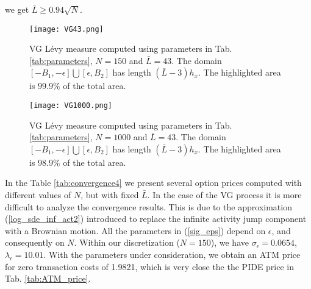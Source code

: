 we get $\bar L \geq 0.94 \sqrt{N}$.
\begin{figure}[t!]
   \centering
   \texttt{[image: VG43.png]}
   \caption{VG L\'evy measure computed using parameters in Tab. \ref{tab:parameters}, $N=150$ and $\bar L=43$. 
   The domain $[-B_1,-\epsilon]\bigcup [\epsilon,B_2]$ has length $(\bar L-3) h_x$. The highlighted area is $99.9\%$ of the total area.}
   \label{Fig15} 
\end{figure}
\begin{figure}[t!]
  \centering
   \texttt{[image: VG1000.png]}
   \caption{VG L\'evy measure computed using parameters in Tab. \ref{tab:parameters}, $N=1000$ and $\bar L=43$. 
   The domain $[-B_1,-\epsilon]\bigcup [\epsilon,B_2]$ has length $(\bar L-3) h_x$. The highlighted area is $98.9\%$ of the total area.}
   \label{Fig16}
\end{figure}

In the Table \ref{tab:convergence4} we present several option prices computed with different values of $N$, but with fixed $\bar L$.
In the case of the VG process it is more difficult to analyze the convergence results.
This is due to the approximation (\ref{log_sde_inf_act2}) introduced to replace the infinite activity jump component with a Brownian motion. All the parameters
in (\ref{sig_eps}) depend on $\epsilon$, and consequently on $N$.
Within our discretization ($N=150$), we have $\sigma_{\epsilon} = 0.0654$, $\lambda_{\epsilon} = 10.01$. 
With the parameters under consideration, we obtain an ATM price for zero transaction costs of 1.9821, which is very close the the PIDE price in Tab. \ref{tab:ATM_price}. 

